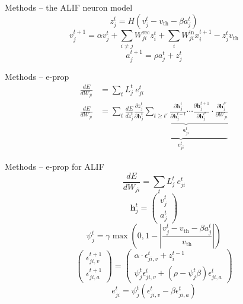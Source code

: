 \documentclass[t]{beamer}
\begin{document}
\begin{frame}{Methods -- the ALIF neuron model}
  \begin{equation}
  z^t_j = H\left(v_j^t - v_\text{th} - \beta a^t_j\right)
  \end{equation}
  \begin{equation}\label{eq:alifV}
  v^{t+1}_j = \alpha v_j^t + \sum_{i\neq j}W^\text{rec}_{ji}z_i^t + \sum_i W^\text{in}_{ji}x_i^{t+1} - z_j^tv_
  \text{th}
  \end{equation}
  \begin{equation}\label{eq:alifA}
  a^{t+1}_j = \rho a^t_j + z^t_j
  \end{equation}
\end{frame}

\begin{frame}{Methods -- e-prop}
  \begin{align*}
    \frac{dE}{dW_{ji}} &= \sum_tL^t_j\ e^t_{ji}\\
    \frac{dE}{dW_{ji}} &= \sum_t\frac{dE}{dz_j^t}\underbrace{\frac{\partial z_j^t}{\partial\mathbf{h}_j^t}\underbrace{\sum_{t\geq t'}\frac{\partial\mathbf{h}^t_j}{\partial\mathbf{h}_j^{t-1}} \cdots \frac{\partial\mathbf{h}_j^{t+1}}{\partial\mathbf{h}_j^{t'}}\cdot\frac{\partial\mathbf{h}_j^{t'}}{\partial W_{ji}}}_{\mathbf{\epsilon}_{ji}^t}}_{e^t_{ji}}
    \end{align*}
\end{frame}

\begin{frame}{Methods -- e-prop for ALIF}
  \begin{equation*}
    \frac{dE}{dW_{ji}} = \sum_tL^t_j\ e^t_{ji}
    \end{equation*}
  \begin{equation}
  \mathbf{h}^t_j = \begin{pmatrix}
  v^t_j\\
  a^t_j
  \end{pmatrix}
  \end{equation}
  \begin{equation}
  \psi_j^t = \gamma \max\left(0, 1 - \left|\frac{v_j^t - v_\text{th} - \beta a^t_j}{v_\text{th}}\right|\right)
  \end{equation}
  \begin{equation}
  \begin{pmatrix}
              \epsilon_{ji, v}^{t+1}\\
              \epsilon_{ji, a}^{t+1}
              \end{pmatrix} = \begin{pmatrix}
              \alpha \cdot\epsilon_{ji, v}^t + z_i^{t-1}\\
              \psi^t_j\epsilon^t_{ji, v} + \left(\rho-\psi^t_j\beta\right)\epsilon^t_{ji, a}
              \end{pmatrix}
  \end{equation}
  \begin{equation}
  e^t_{ji} = \psi^t_j\left(\epsilon_{ji, v}^t - \beta\epsilon_{ji, a}^t\right)
  \end{equation}
\end{frame}
\end{document}
